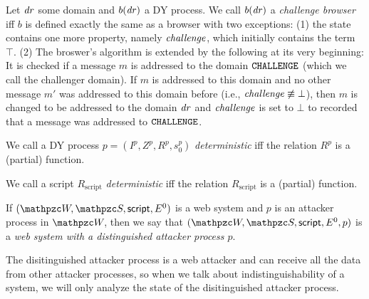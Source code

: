   \begin{definition}
    Let $\mathit{dr}$ some domain and $b(\mathit{dr})$ a DY process. 
    We call $b(\mathit{dr})$ a \emph{challenge browser} iff $b$
    is defined exactly the same as a browser with two exceptions: 
    (1) the state contains one more property, namely 
    $\mathit{challenge}$, which initially contains the term $\top$. 
    (2) The broswer's algorithm is extended by the following at 
    its very beginning: It is checked if a message $m$ is 
    addressed to the domain $\mathtt{CHALLENGE}$ (which we call the 
    challenger domain). If $m$ is addressed to this domain and 
    no other message $m'$ was addressed to this domain before 
    (i.e., $\mathit{challenge} \not\equiv \bot$), then $m$ is changed 
    to be addressed to the domain $\mathit{dr}$ and $\mathit{challenge}$ 
    is set to $\bot$ to recorded that a message was addressed to 
    $\mathtt{CHALLENGE}$.
  \end{definition}
  
  \begin{definition}
    We call a DY process $p = (I^p,Z^p,R^p,s_0^p)$ \emph{deterministic} iff 
    the relation $R^p$ is a (partial) function.
  
    We call a script $R_\text{script}$ \emph{deterministic} iff the relation 
    $R_\text{script}$ is a (partial) function.
  \end{definition}

  \newc
  \begin{definition}
    If $(\websystem, \scriptset,\mathsf{script}, E^0)$ is
    a web system and $p$ is an attacker process in
    $\websystem$, then we say that $(\websystem,
    \scriptset,\mathsf{script}, E^0,p)$ is a \emph{web
    system with a distinguished attacker process $p$}. 
  \end{definition}
  \oldc

  The disitinguished attacker process is a web attacker and 
  can receive all the data from other attacker processes, 
  so when we talk about indistinguishability of a system, 
  we will only analyze the state of the disitinguished attacker process.
  
